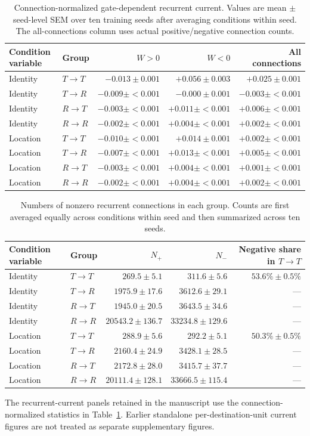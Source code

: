 \begin{table}[t]
\centering
\caption{Connection-normalized gate-dependent recurrent current. Values are mean \(\pm\) seed-level SEM over ten training seeds after averaging conditions within seed. The all-connections column uses actual positive/negative connection counts.}
\label{tab:recurrent-current}
\begin{tabular}{llrrr}
\toprule
Condition variable & Group & \(W>0\) & \(W<0\) & All connections \\
\midrule
Identity & \(T\!\to\!T\) & \(-0.013\pm0.001\) & \(+0.056\pm0.003\) & \(+0.025\pm0.001\) \\
Identity & \(T\!\to\!R\) & \(-0.009\pm{<}0.001\) & \(-0.000\pm0.001\) & \(-0.003\pm{<}0.001\) \\
Identity & \(R\!\to\!T\) & \(-0.003\pm{<}0.001\) & \(+0.011\pm{<}0.001\) & \(+0.006\pm{<}0.001\) \\
Identity & \(R\!\to\!R\) & \(-0.002\pm{<}0.001\) & \(+0.004\pm{<}0.001\) & \(+0.002\pm{<}0.001\) \\
Location & \(T\!\to\!T\) & \(-0.010\pm{<}0.001\) & \(+0.014\pm0.001\) & \(+0.002\pm{<}0.001\) \\
Location & \(T\!\to\!R\) & \(-0.007\pm{<}0.001\) & \(+0.013\pm{<}0.001\) & \(+0.005\pm{<}0.001\) \\
Location & \(R\!\to\!T\) & \(-0.003\pm{<}0.001\) & \(+0.004\pm{<}0.001\) & \(+0.001\pm{<}0.001\) \\
Location & \(R\!\to\!R\) & \(-0.002\pm{<}0.001\) & \(+0.004\pm{<}0.001\) & \(+0.002\pm{<}0.001\) \\
\bottomrule
\end{tabular}
\end{table}

\begin{table}[t]
\centering
\caption{Numbers of nonzero recurrent connections in each group. Counts are first averaged equally across conditions within seed and then summarized across ten seeds.}
\label{tab:recurrent-counts}
\begin{tabular}{llrrr}
\toprule
Condition variable & Group & \(N_+\) & \(N_-\) & Negative share in \(T\!\to\!T\) \\
\midrule
Identity & \(T\!\to\!T\) & \(269.5\pm5.1\) & \(311.6\pm5.6\) & \(53.6\%\pm0.5\%\) \\
Identity & \(T\!\to\!R\) & \(1975.9\pm17.6\) & \(3612.6\pm29.1\) & --- \\
Identity & \(R\!\to\!T\) & \(1945.0\pm20.5\) & \(3643.5\pm34.6\) & --- \\
Identity & \(R\!\to\!R\) & \(20543.2\pm136.7\) & \(33234.8\pm129.6\) & --- \\
Location & \(T\!\to\!T\) & \(288.9\pm5.6\) & \(292.2\pm5.1\) & \(50.3\%\pm0.5\%\) \\
Location & \(T\!\to\!R\) & \(2160.4\pm24.9\) & \(3428.1\pm28.5\) & --- \\
Location & \(R\!\to\!T\) & \(2172.8\pm28.0\) & \(3415.7\pm37.7\) & --- \\
Location & \(R\!\to\!R\) & \(20111.4\pm128.1\) & \(33666.5\pm115.4\) & --- \\
\bottomrule
\end{tabular}
\end{table}

The recurrent-current panels retained in the manuscript use the connection-normalized statistics in Table~\ref{tab:recurrent-current}. Earlier standalone per-destination-unit current figures are not treated as separate supplementary figures.
